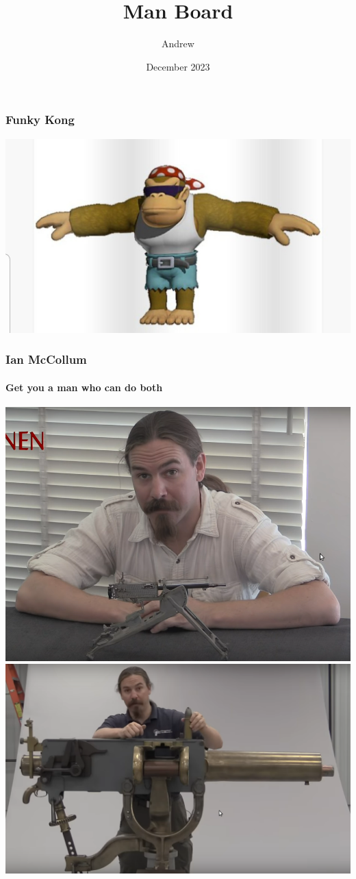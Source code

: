 \documentclass{beamer}
\title{Man Board}
\author{Andrew}
\date{December 2023}
\begin{document}
\frame{\titlepage}

\begin{frame}
\frametitle{Funky Kong}
\includegraphics[height=\paperheight]{funky kong.jpg}
\end{frame}

\begin{frame}
	\frametitle{Ian McCollum}
		\framesubtitle{Get you a man who can do both}
	\vspace{1em}
	\includegraphics[scale=0.14]{ian 1.png}
	\includegraphics[scale=0.14]{ian 2.png}
\end{frame}
\end{document}
